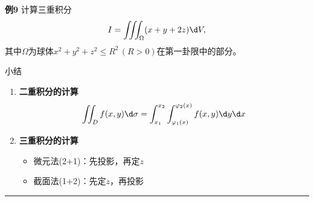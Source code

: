 \begin{frame}
	\linespread{1.2}
	\begin{exampleblock}{{\bf 例9}\hfill}
		计算三重积分
		$$I=\iiint_{\Omega}(x+y+2z)\d V,$$
		其中$\Omega$为球体$x^2+y^2+z^2\leq R^2\,(R>0)$在第一卦限中的部分。
	\end{exampleblock}
\end{frame}

\begin{frame}[<+->]{小结}
	\linespread{1.2}
	\begin{enumerate}
	  \item {\bf 二重积分的计算}
	  $$\iint_Df(x,y)\d\sigma=\int_{x_1}^{x_2}
	\int_{\varphi_1(x)}^{\varphi_2(x)}f(x,y)\d y\d x$$
	  \item {\bf 三重积分的计算}
	  \begin{itemize}
	    \item {微元法{\bb (2+1)}：}先投影，再定$z$
	    \item {截面法{\bb (1+2)}：}先定$z$，再投影
	  \end{itemize}
	\end{enumerate}
	\pause
	\hrule
	\bigskip \pause 
	\begin{center}
		\pause
		
	\end{center}
	
\end{frame}

 
% 
